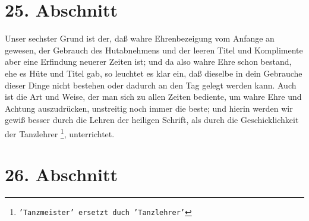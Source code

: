 \section{25. Abschnitt} \label{kap9_ab25}

Unser sechster Grund ist der, daß wahre Ehrenbezeigung vom Anfange an gewesen,
der Gebrauch des Hutabnehmens und der leeren Titel und Komplimente aber eine
Erfindung neuerer Zeiten ist; und da also wahre Ehre schon bestand, ehe es Hüte
und Titel gab, so leuchtet es klar ein, daß dieselbe in dein Gebrauche dieser
Dinge nicht bestehen oder dadurch an den Tag gelegt werden kann. Auch ist die
Art und Weise, der man sich zu allen Zeiten bediente, um wahre Ehre und Achtung
auszudrücken, unstreitig noch immer die beste; und hierin werden wir gewiß
besser durch die Lehren der heiligen Schrift, als durch die Geschicklichkeit der
Tanzlehrer
\footnote{\texttt{'Tanzmeister' ersetzt duch 'Tanzlehrer'}}, unterrichtet.

\section{26. Abschnitt} \label{kap9_ab26}

